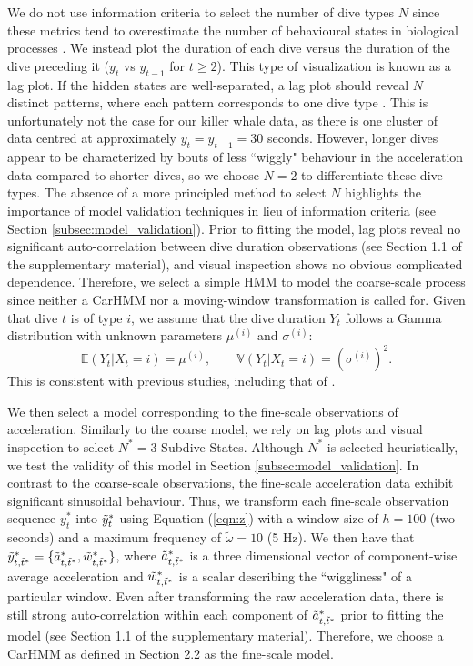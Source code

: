 We do not use information criteria to select the number of dive types $N$ since these metrics tend to overestimate the number of behavioural states in biological processes \citep{Pohle:2017}. We instead plot the duration of each dive versus the duration of the dive preceding it ($y_t$ vs $y_{t-1}$ for $t \geq 2$). This type of visualization is known as a lag plot. If the hidden states are well-separated, a lag plot should reveal $N$ distinct patterns, where each pattern corresponds to one dive type \citep{Lawler:2019}. This is unfortunately not the case for our killer whale data, as there is one cluster of data centred at approximately $y_t = y_{t-1} = 30$ seconds. However, longer dives appear to be characterized by bouts of less ``wiggly" behaviour in the acceleration data compared to shorter dives, so we choose $N = 2$ to differentiate these dive types. The absence of a more principled method to select $N$ highlights the importance of model validation techniques in lieu of information criteria (see Section \ref{subsec:model_validation}).
%
Prior to fitting the model, lag plots reveal no significant auto-correlation between dive duration observations (see Section 1.1 of the supplementary material), and visual inspection shows no obvious complicated dependence. Therefore, we select a simple HMM to model the coarse-scale process since neither a CarHMM nor a moving-window transformation is called for.
%
Given that dive $t$ is of type $i$, we assume that the dive duration $Y_t$ follows a Gamma distribution with unknown parameters $\mu^{(i)}$ and $\sigma^{(i)}$:
%
$$\mathbb{E}(Y_t|X_t = i) = \mu^{(i)}, \qquad \mathbb{V}(Y_t|X_t = i) = \left(\sigma^{(i)}\right)^2.$$
%
This is consistent with previous studies, including that of \citet{Barajas:2017}. 
%

We then select a model corresponding to the fine-scale observations of acceleration. Similarly to the coarse model, we rely on lag plots and visual inspection to select $N^*=3$ Subdive States. Although $N^*$ is selected heuristically, we test the validity of this model in Section \ref{subsec:model_validation}.
%
In contrast to the coarse-scale observations, the fine-scale acceleration data exhibit significant sinusoidal behaviour. Thus, we transform each fine-scale observation sequence $y_t^*$ into $\tilde{y}^*_t$ using Equation (\ref{eqn:z}) with a window size of $h=100$ (two seconds) and a maximum frequency of $\tilde{\omega}=10$ (5 Hz). 
We then have that $\tilde{y}^*_{t,\tilde t^*} = \{\tilde{a}^*_{t,\tilde t^*},\tilde{w}^*_{t,\tilde t^*}\}$, where $\tilde{a}^*_{t,\tilde t^*}$ is a three dimensional vector of component-wise average acceleration and $\tilde{w}^*_{t,\tilde t^*}$ is a scalar describing the ``wiggliness" of a particular window. Even after transforming the raw acceleration data, there is still strong auto-correlation within each component of $\tilde{a}^*_{t,\tilde t^*}$ prior to fitting the model (see Section 1.1 of the supplementary material). Therefore, we choose a CarHMM as defined in Section 2.2 as the fine-scale model.

